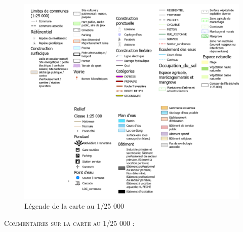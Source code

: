 \documentclass{themeensg}
\begin{document}
\begin{appendices}
\begin{figure}[!h]
\centering
\includegraphics[width=\linewidth]{images/Annexes/Resultat/legende25.png}
\caption{Légende de la carte au 1/25 000}
\label{15000_legende}
\end{figure}

\vspace{3cm}
\textsc{Commentaires sur la carte au 1/25 000 :}\\


\end{appendices}
\end{document}
